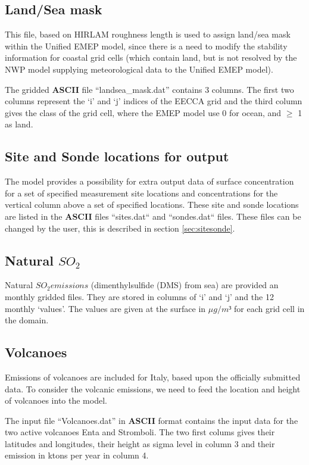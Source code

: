 \subsection{Land/Sea mask}
This file, based on HIRLAM roughness length is used
to assign land/sea mask within the Unified EMEP model, since there is
a need to modify the stability information for coastal grid cells
(which contain land, but is not resolved by the NWP model supplying 
meteorological data to the Unified EMEP model). 

The gridded {\bf ASCII} file ``landsea\_mask.dat'' contains 3 columns. 
The first two columns represent the `i' and `j' indices of the EECCA
grid and the third column gives the class of the grid cell, where the 
EMEP model use 0 for ocean, and $\geq$ 1 as land.%

\subsection{Site and Sonde locations for output}\label{sec:sitessondes_input}
The model provides a possibility for extra output data of surface concentration 
for a set of specified measurement site locations and concentrations for the vertical 
column above a set of specified locations. These site and sonde locations are listed 
in the {\bf ASCII} files ``sites.dat`` and ``sondes.dat`` files. These files can be 
changed by the user, this is described in section \ref{sec:sitesonde}.


\subsection{Natural $SO_2$}
Natural $SO_2 emissions$ (dimenthylsulfide (DMS) from sea) are provided 
an monthly gridded files. They are stored in columns of `i' and `j' and the 12 monthly `values'. 
The values are given at the surface in $\mu g /m³ $ for each grid cell in the domain. 

\subsection{Volcanoes}

Emissions of volcanoes are included for Italy, based upon the
officially submitted data.
To consider the volcanic emissions, we need to feed the location
and height of volcanoes into the model. 

The input file ``Volcanoes.dat'' in {\bf ASCII} format contains the input data for the two active volcanoes
 Enta and Stromboli. The two first colums gives their latitudes and longitudes, their height as sigma level
 in column 3 and their emission in ktons per year in column 4. 

